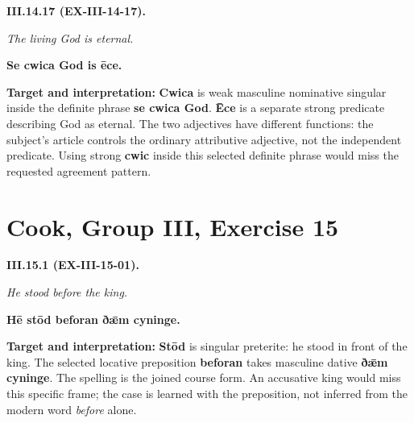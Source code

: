 \par\begin{minipage}{\linewidth}\raggedright
\textbf{III.14.17 (EX-III-14-17).}

\emph{The living God is eternal.}

\textbf{Se cwica God is ēce.}

\textbf{Target and interpretation:} \textbf{Cwica} is weak masculine nominative singular inside the definite phrase \textbf{se cwica God}. \textbf{Ēce} is a separate strong predicate describing God as eternal. The two adjectives have different functions: the subject's article controls the ordinary attributive adjective, not the independent predicate. Using strong \textbf{cwic} inside this selected definite phrase would miss the requested agreement pattern.

\end{minipage}\par\addvspace{4pt}

\section*{Cook, Group III, Exercise 15}

\par\begin{minipage}{\linewidth}\raggedright
\textbf{III.15.1 (EX-III-15-01).}

\emph{He stood before the king.}

\textbf{Hē stōd beforan ðǣm cyninge.}

\textbf{Target and interpretation:} \textbf{Stōd} is singular preterite: he stood in front of the king. The selected locative preposition \textbf{beforan} takes masculine dative \textbf{ðǣm cyninge}. The spelling is the joined course form. An accusative king would miss this specific frame; the case is learned with the preposition, not inferred from the modern word \emph{before} alone.

\end{minipage}\par\addvspace{4pt}


